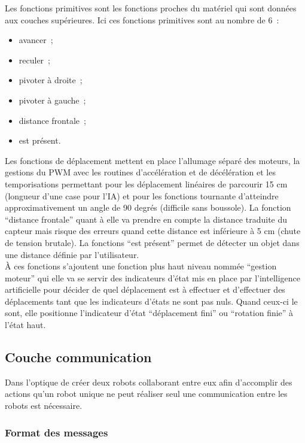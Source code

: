 \documentclass{article}
\begin{document}
Les fonctions primitives sont les fonctions proches du matériel qui sont données aux couches supérieures. Ici ces fonctions primitives sont au nombre de 6~: \\

\begin{itemize}
  \item avancer~;
  \item reculer~;
  \item pivoter à droite~;
  \item pivoter à gauche~;
  \item distance frontale~;
  \item est présent. \\
\end{itemize}

Les fonctions de déplacement mettent en place l'allumage séparé des moteurs, la gestions du PWM avec les routines d'accélération et de décélération et les temporisations permettant pour les déplacement linéaires de parcourir 15 cm (longueur d'une case pour l'IA) et pour les fonctions tournante d'atteindre approximativement un angle de 90 degrés (difficile sans boussole). La fonction ``distance frontale'' quant à elle va prendre en compte la distance traduite du capteur mais risque des erreurs quand cette distance est inférieure à 5 cm (chute de tension brutale). La fonctions ``est présent'' permet de détecter un objet dans une distance définie par l'utilisateur. \\

À ces fonctions s'ajoutent une fonction plus haut niveau nommée ``gestion moteur'' qui elle va se servir des indicateurs d'état mis en place par l'intelligence artificielle pour décider de quel déplacement est à effectuer et d'effectuer des déplacements tant que les indicateurs d'états ne sont pas nuls. Quand ceux-ci le sont, elle positionne l'indicateur d'état ``déplacement fini'' ou ``rotation finie'' à l'état haut.

\subsection{Couche communication}

Dans l'optique de créer deux robots collaborant entre eux afin d’accomplir des actions qu'un robot unique ne peut réaliser seul une communication entre les robots est nécessaire.

\subsubsection{Format des messages}
\end{document}
